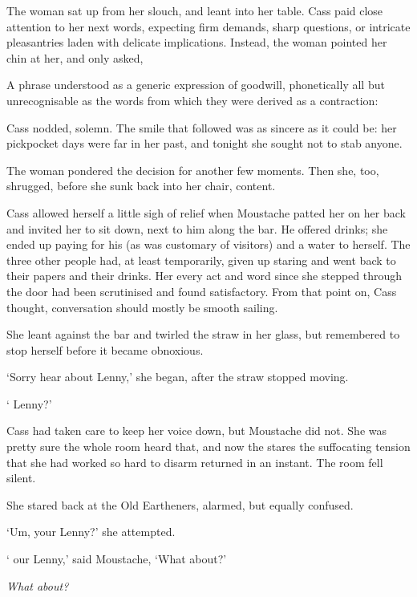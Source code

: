 The woman sat up from her slouch, and leant into her table. Cass paid
close attention to her next words, expecting firm demands, sharp
questions, or intricate pleasantries laden with delicate
implications. Instead, the woman pointed her chin at her, and only
asked,


A phrase understood as a generic expression of goodwill, phonetically
all but unrecognisable as the words from which they were derived as a
contraction: 

 Cass nodded, solemn. The smile that followed was as
sincere as it could be: her pickpocket days were far in her past, and
tonight she sought not to stab anyone.

The woman pondered the decision for another few moments. Then she,
too, shrugged, before she sunk back into her chair, content.

Cass allowed herself a little sigh of relief when Moustache patted
her on her back and invited her to sit down, next to him along the
bar. He offered drinks; she ended up paying for his (as was customary
of visitors) and a water to herself. The three other people had, at
least temporarily, given up staring and went back to their papers and
their drinks. Her every act and word since she stepped through the
door had been scrutinised and found satisfactory. From that point on,
Cass thought, conversation should mostly be smooth sailing.

She leant against the bar and twirled the straw in her glass,
but remembered to stop herself before it became obnoxious.

`Sorry  hear about Lenny,' she began, after the straw
stopped moving.

`\textemdash{} Lenny?'

Cass had taken care to keep her voice down, but Moustache did not. She
was pretty sure the whole room heard that, and now the stares
\textemdash{} the suffocating tension that she had worked so hard to
disarm \textemdash{} returned in an instant. The room fell
silent.

She stared back at the Old Eartheners, alarmed, but equally confused.

`Um, your  Lenny?' she attempted.

` our  Lenny,' said Moustache, `What about?'

\textit{What about?}

